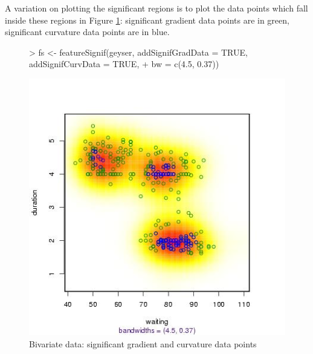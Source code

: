 \documentclass[a4paper]{article}
\begin{document}
A variation on plotting the significant regions is to plot the data points which
fall inside these regions in Figure \ref{fig:fs5}: 
significant gradient data points are in green,  
significant curvature data points are in blue.
\begin{figure}[!ht]
\begin{center}
\begin{Schunk}
\begin{Sinput}
> fs <- featureSignif(geyser, addSignifGradData = TRUE, addSignifCurvData = TRUE, 
+     bw = c(4.5, 0.37))
\end{Sinput}
\end{Schunk}
\includegraphics{feature-004}
\caption{Bivariate data: significant gradient and curvature data points}
\label{fig:fs5}
\end{center}
\end{figure}
\end{document}
